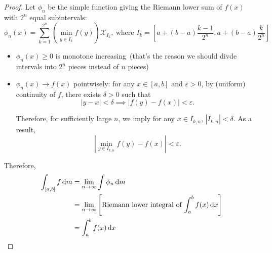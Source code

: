 \begin{proof}
Let $\phi_n$ be the simple function giving the Riemann lower sum of $f(x)$ with $2^n$ equal subintervals:
\[
\phi_n(x)=\sum_{k=1}^{2^n}\left(\min_{y\in\bar{I}_k}f(y)\right)\mathcal{X}_{I_k},\ \text{where }I_k=[a+(b-a)\frac{k-1}{2^n}, a+(b-a)\frac{k}{2^n}]
\]
\begin{itemize}
\item
$\phi_n(x)\ge0$ is monotone increasing~(that's the reason we should divde intervals into $2^n$ pieces instead of $n$ pieces)
\item
$\phi_n(x)\to f(x)$ pointwisely:
for any $x\in[a,b]$ and $\varepsilon>0$, by (uniform) continuity of $f$, there exists $\delta>0$ such that
\[
|y-x|<\delta\implies |f(y)-f(x)|<\varepsilon.
\]

Therefore, for sufficiently large $n$, we imply for any $x\in I_{k,n}$, $|I_{k,n}|<\delta$.
As a result, 
\[
\left|\min_{y\in I_{k,n}}f(y) - f(x)\right|<\varepsilon.
\]
\end{itemize}
Therefore,
\begin{align*}
\int_{[a,b]}f\,\mathrm{d} m&=\lim_{n\to\infty}\int\phi_n\,\mathrm{d} m
\\&=
\lim_{n\to\infty}\left[\text{Riemann lower integral of $\int_a^bf(x)\,\mathrm{d} x$}\right]\\&=\int_a^bf(x)\,\mathrm{d} x
\end{align*}
\end{proof}

